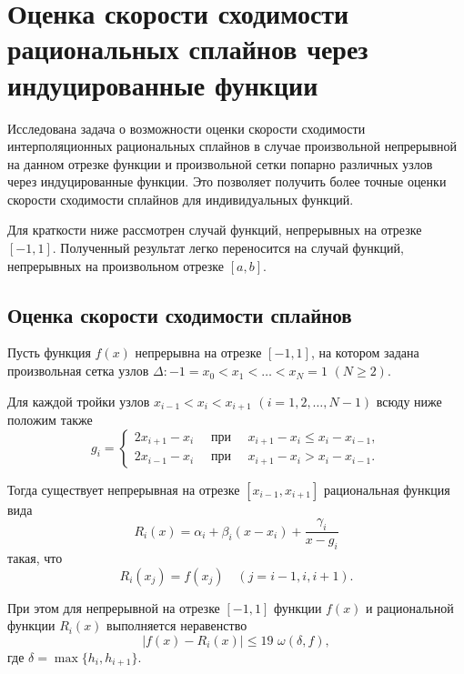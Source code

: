 \section{Оценка скорости сходимости рациональных сплайнов через индуцированные функции}
%
%
Исследована задача о возможности оценки скорости сходимости интерполяционных рациональных  сплайнов
в случае произвольной непрерывной на данном отрезке функции и произвольной сетки попарно различных узлов
через индуцированные функции. Это позволяет получить более точные оценки скорости сходимости сплайнов
для индивидуальных функций.

Для краткости ниже рассмотрен случай функций, непрерывных на отрезке $[-1,1]$. Полученный результат
легко переносится на случай функций, непрерывных на произвольном отрезке $[a,b]$.

\subsection{Оценка скорости сходимости сплайнов}

Пусть функция $f(x)$ непрерывна на отрезке $[-1,1]$, на котором задана произвольная сетка узлов
$\Delta: -1=x_0<x_1<\dots<x_N=1$ $(N\geqslant 2)$.

Для каждой тройки узлов $x_{i-1}<x_i<x_{i+1}$
$(i=1,2,\dots,{N-1})$  всюду ниже положим также
\begin{equation}\label{2.3}
g_i=\begin{cases}
2x_{i+1}-x_i \quad\text{ при }\quad x_{i+1}-x_i\leqslant x_i-x_{i-1},\\
2x_{i-1}-x_i \quad \text{ при }\quad x_{i+1}-x_i> x_i-x_{i-1}.
\end{cases}
\end{equation}


Тогда существует непрерывная на отрезке $[x_{i-1}, x_{i+1}]$
рациональная функция вида
\begin{equation}\label{2.1}
R_i (x)=\alpha_i+\beta_i(x-x_i)+\frac{\gamma_i}{x-g_i}
\end{equation}
такая, что
$$
R_i(x_j)=f(x_j)\quad (j=i-1,i,i+1).
$$

При этом для непрерывной на отрезке $[-1,1]$ функции $f(x)$ и рациональной функции $R_i(x)$
выполняется неравенство
$$
|f(x)-R_i(x)|\leqslant 19 \,\,\omega (\delta, f),
$$
где $\delta=\max\{h_i, h_{i+1}\}$.


